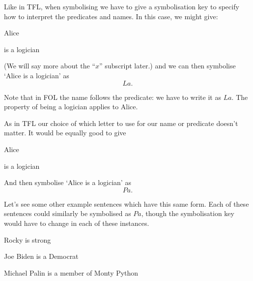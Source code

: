 
Like in TFL, when symbolising we have to give a symbolisation key to specify how to interpret the predicates and names. In this case, we might give:
\begin{ekey}
\item[a] Alice
\item[Lx]  is a logician
\end{ekey}(We will say more about the ``$x$'' subscript later.)
and we can then symbolise `Alice is a logician' as $$La.$$ 

Note that in FOL the name follows the predicate: we have to write it as $La$. The property of being a logician applies to Alice.

As in TFL our choice of which letter to use for our name or predicate doesn't matter. It would be equally good to give
\begin{ekey}
\item[a] Alice
\item[Px]  is a logician
\end{ekey}And then symbolise `Alice is a logician' as $$Pa.$$

Let's see some other example sentences which have this same form. Each of these sentences could similarly be symbolised as $Pa$, though the symbolisation key would have to change in each of these instances.
\begin{samplesent}
\item\label{sent:folrocky} Rocky is strong
\item\label{sent:folbiden} Joe Biden is a Democrat
\item\label{sent:folpalin} Michael Palin is a member of Monty Python
\end{samplesent}

